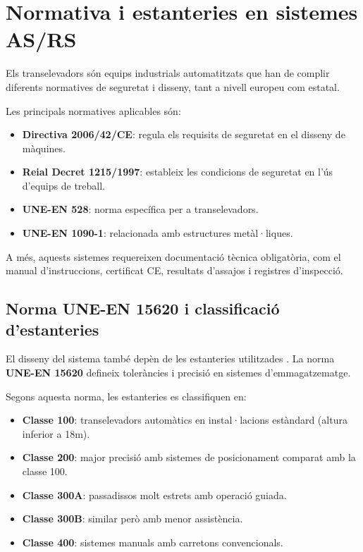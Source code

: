 \documentclass[12pt,a4paper]{report}
\begin{document}
\section{Normativa i estanteries en sistemes AS/RS}

Els transelevadors són equips industrials automatitzats que han de complir diferents normatives de seguretat i disseny, tant a nivell europeu com estatal.

Les principals normatives aplicables \cite{manual_logistica} són:

\begin{itemize}
    \item \textbf{Directiva 2006/42/CE}: regula els requisits de seguretat en el disseny de màquines.
    \item \textbf{Reial Decret 1215/1997}: estableix les condicions de seguretat en l'ús d'equips de treball.
    \item \textbf{UNE-EN 528}: norma específica per a transelevadors.
    \item \textbf{UNE-EN 1090-1}: relacionada amb estructures metàl·liques.
\end{itemize}

A més, aquests sistemes requereixen documentació tècnica obligatòria, com el manual d'instruccions, certificat CE, resultats d'assajos i registres d'inspecció.

\subsection{Norma UNE-EN 15620 i classificació d'estanteries}

El disseny del sistema també depèn de les estanteries utilitzades \cite{rack_estanterias_norma}. La norma \textbf{UNE-EN 15620} defineix toleràncies i precisió en sistemes d'emmagatzematge.

Segons aquesta norma, les estanteries es classifiquen en:

\begin{itemize}
    \item \textbf{Classe 100}: transelevadors automàtics en instal·lacions estàndard (altura inferior a 18m).
    \item \textbf{Classe 200}: major precisió amb sistemes de posicionament comparat amb la classe 100.
    \item \textbf{Classe 300A}: passadissos molt estrets amb operació guiada.
    \item \textbf{Classe 300B}: similar però amb menor assistència.
    \item \textbf{Classe 400}: sistemes manuals amb carretons convencionals.
\end{itemize}
\end{document}
